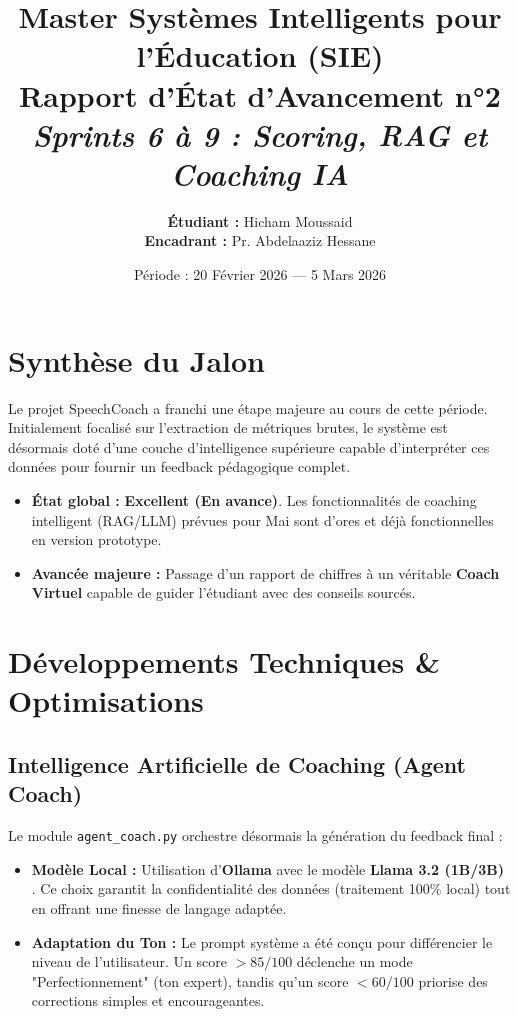 \documentclass[12pt,a4paper]{article}
\title{
    \vspace{-2cm}
    \large Master Systèmes Intelligents pour l'Éducation (SIE)\\
    \vspace{0.5cm}
    \huge \textbf{Rapport d'État d'Avancement n°2}\\
    \large \textit{Sprints 6 à 9 : Scoring, RAG et Coaching IA}
}
\author{\textbf{Étudiant :} Hicham Moussaid \\ \textbf{Encadrant :} Pr. Abdelaaziz Hessane}
\date{Période : 20 Février 2026 --- 5 Mars 2026}
\begin{document}
\maketitle

\section{Synthèse du Jalon}
Le projet SpeechCoach a franchi une étape majeure au cours de cette période. Initialement focalisé sur l'extraction de métriques brutes, le système est désormais doté d'une couche d'intelligence supérieure capable d'interpréter ces données pour fournir un feedback pédagogique complet.
\begin{itemize}
    \item \textbf{État global :} \textbf{Excellent (En avance)}. Les fonctionnalités de coaching intelligent (RAG/LLM) prévues pour Mai sont d'ores et déjà fonctionnelles en version prototype.
    \item \textbf{Avancée majeure :} Passage d'un rapport de chiffres à un véritable \textbf{Coach Virtuel} capable de guider l'étudiant avec des conseils sourcés.
\end{itemize}

\section{Développements Techniques \& Optimisations}

\subsection{Intelligence Artificielle de Coaching (Agent Coach)}
Le module \texttt{agent\_coach.py} orchestre désormais la génération du feedback final :
\begin{itemize}
    \item \textbf{Modèle Local :} Utilisation d'\textbf{Ollama} avec le modèle \textbf{Llama 3.2 (1B/3B)} \cite{meta2024llama}. Ce choix garantit la confidentialité des données (traitement 100\% local) tout en offrant une finesse de langage adaptée.
    \item \textbf{Adaptation du Ton :} Le prompt système a été conçu pour différencier le niveau de l'utilisateur. Un score $>85/100$ déclenche un mode "Perfectionnement" (ton expert), tandis qu'un score $<60/100$ priorise des corrections simples et encourageantes.
\end{itemize}
\end{document}
